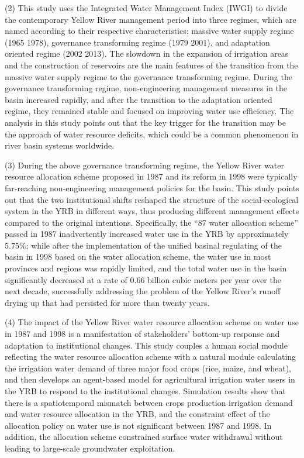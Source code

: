 \begin{eabstract}
  (2) This study uses the Integrated Water Management Index (IWGI) to divide the contemporary Yellow River management period into three regimes, which are named according to their respective characteristics: massive water supply regime (1965 \textendash{} 1978), governance transforming regime (1979 \textendash{} 2001), and adaptation oriented regime (2002 \textendash{} 2013). The slowdown in the expansion of irrigation areas and the construction of reservoirs are the main features of the transition from the massive water supply regime to the governance transforming regime. During the governance transforming regime, non-engineering management measures in the basin increased rapidly, and after the transition to the adaptation oriented regime, they remained stable and focused on improving water use efficiency. The analysis in this study points out that the key trigger for the transition may be the approach of water resource deficits, which could be a common phenomenon in river basin systems worldwide.

  (3) During the above governance transforming regime, the Yellow River water resource allocation scheme proposed in 1987 and its reform in 1998 were typically far-reaching non-engineering management policies for the basin. 
  This study points out that the two institutional shifts reshaped the structure of the social-ecological system in the YRB in different ways, thus producing different management effects compared to the original intentions. Specifically, the ``87 water allocation scheme'' passed in 1987 inadvertently increased water use in the YRB by approximately $5.75\%$; while after the implementation of the unified basinal regulating of the basin in 1998 based on the water allocation scheme, the water use in most provinces and regions was rapidly limited, and the total water use in the basin significantly decreased at a rate of 0.66 billion cubic meters per year over the next decade, successfully addressing the problem of the Yellow River's runoff drying up that had persisted for more than twenty years.

  (4) The impact of the Yellow River water resource allocation scheme on water use in 1987 and 1998 is a manifestation of stakeholders' bottom-up response and adaptation to institutional changes. 
  This study couples a human social module reflecting the water resource allocation scheme with a natural module calculating the irrigation water demand of three major food crops (rice, maize, and wheat), and then develops an agent-based model for agricultural irrigation water users in the YRB to respond to the institutional changes. 
  Simulation results show that there is a spatiotemporal mismatch between crops production irrigation demand and water resource allocation in the YRB, and the constraint effect of the allocation policy on water use is not significant between 1987 and 1998. 
  In addition, the allocation scheme constrained surface water withdrawal without leading to large-scale groundwater exploitation.


\end{eabstract}
